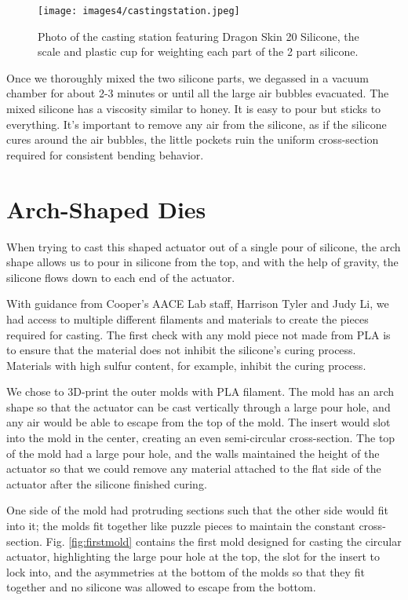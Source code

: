 \begin{figure}[h]
    \centering
    \texttt{[image: images4/castingstation.jpeg]}
    \caption{Photo of the casting station featuring Dragon Skin 20 Silicone, the scale and plastic cup for weighting each part of the 2 part silicone.}
    \label{fig:castingstation}
\end{figure}

Once we thoroughly mixed the two silicone parts, we degassed in a vacuum chamber for about 2-3 minutes or until all the large air bubbles evacuated. The mixed silicone has a viscosity similar to honey. It is easy to pour but sticks to everything. It's important to remove any air from the silicone, as if the silicone cures around the air bubbles, the little pockets ruin the uniform cross-section required for consistent bending behavior. 

\clearpage
\section{Arch-Shaped Dies}
When trying to cast this shaped actuator out of a single pour of silicone, the arch shape allows us to pour in silicone from the top, and with the help of gravity, the silicone flows down to each end of the actuator. 

With guidance from Cooper's AACE Lab staff, Harrison Tyler and Judy Li, we had access to multiple different filaments and materials to create the pieces required for casting. The first check with any mold piece not made from PLA is to ensure that the material does not inhibit the silicone's curing process. Materials with high sulfur content, for example, inhibit the curing process. 

We chose to 3D-print the outer molds with PLA filament. The mold has an arch shape so that the actuator can be cast vertically through a large pour hole, and any air would be able to escape from the top of the mold. The insert would slot into the mold in the center, creating an even semi-circular cross-section. The top of the mold had a large pour hole, and the walls maintained the height of the actuator so that we could remove any material attached to the flat side of the actuator after the silicone finished curing. 

One side of the mold had protruding sections such that the other side would fit into it; the molds fit together like puzzle pieces to maintain the constant cross-section. Fig. \ref{fig:firstmold} contains the first mold designed for casting the circular actuator, highlighting the large pour hole at the top, the slot for the insert to lock into, and the asymmetries at the bottom of the molds so that they fit together and no silicone was allowed to escape from the bottom. 

